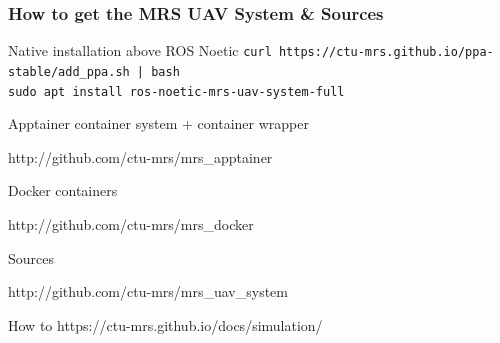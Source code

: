 \documentclass[aspectratio=169]{beamer}
\begin{document}
\begin{frame}
  \frametitle{How to get the MRS UAV System \& Sources}

  \begin{block}{Native installation above ROS Noetic}
    \texttt{curl https://ctu-mrs.github.io/ppa-stable/add\_ppa.sh | bash}\\
    \texttt{sudo apt install ros-noetic-mrs-uav-system-full}
  \end{block}

  \begin{block}{Apptainer container system + container wrapper}
    \begin{center}
      \large {\color{blue} http://github.com/ctu-mrs/mrs\_apptainer}
    \end{center}
  \end{block}

  \begin{block}{Docker containers}
    \begin{center}
      \large {\color{blue} http://github.com/ctu-mrs/mrs\_docker}
    \end{center}
  \end{block}

  \begin{block}{Sources}
    \begin{center}
      \large {\color{blue} http://github.com/ctu-mrs/mrs\_uav\_system}
    \end{center}
  \end{block}

  \begin{block}{How to}
    \large {\color{blue} https://ctu-mrs.github.io/docs/simulation/}
  \end{block}

\end{frame}


\end{document}
